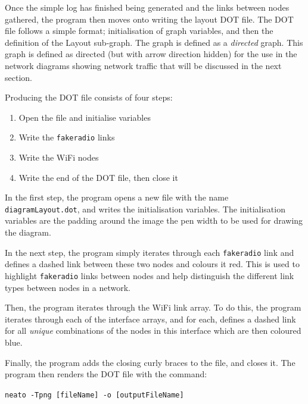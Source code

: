 Once the simple log has finished being generated and the links between nodes gathered, the program then moves onto writing the layout DOT file.
The DOT file follows a simple format; initialisation of graph variables, and then the definition of the Layout sub-graph.
The graph is defined as a \emph{directed} graph.
This graph is defined as directed (but with arrow direction hidden) for the use in the network diagrams showing network traffic that will be discussed in the next section.

Producing the DOT file consists of four steps:
\begin{enumerate}
    \item Open the file and initialise variables
    \item Write the \texttt{fakeradio} links
    \item Write the WiFi nodes
    \item Write the end of the DOT file, then close it
\end{enumerate}

In the first step, the program opens a new file with the name \texttt{diagramLayout.dot}, and writes the initialisation variables.
The initialisation variables are the padding around the image the pen width to be used for drawing the diagram.

In the next step, the program simply iterates through each \texttt{fakeradio} link and defines a dashed link between these two nodes and colours it red.
This is used to highlight \texttt{fakeradio} links between nodes and help distinguish the different link types between nodes in a network.


Then, the program iterates through the WiFi link array. 
To do this, the program iterates through each of the interface arrays, and for each, defines a dashed link for all \emph{unique} combinations of the nodes in this interface which are then coloured blue.

Finally, the program adds the closing curly braces to the file, and closes it.
The program then renders the DOT file with the command:

\texttt{neato -Tpng [fileName] -o [outputFileName]}

